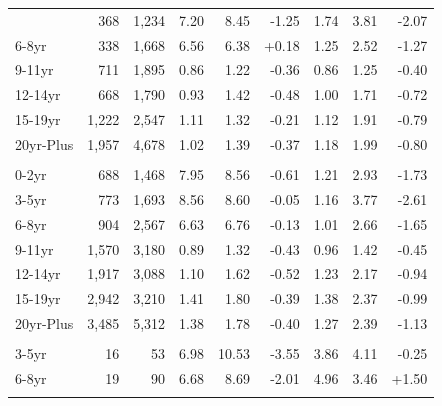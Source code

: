 \begin{table}
\begin{tabular}[t]{lrrrrrrrr}
{\hspace{1em}3-5yr & 368 & 1,234 & 7.20 & 8.45 & -1.25 & 1.74 & 3.81 & -2.07\\
\hspace{1em}6-8yr & 338 & 1,668 & 6.56 & 6.38 & +0.18 & 1.25 & 2.52 & -1.27\\
\hspace{1em}9-11yr & 711 & 1,895 & 0.86 & 1.22 & -0.36 & 0.86 & 1.25 & -0.40\\
\hspace{1em}12-14yr & 668 & 1,790 & 0.93 & 1.42 & -0.48 & 1.00 & 1.71 & -0.72\\
\hspace{1em}15-19yr & 1,222 & 2,547 & 1.11 & 1.32 & -0.21 & 1.12 & 1.91 & -0.79\\
\hspace{1em}20yr-Plus & 1,957 & 4,678 & 1.02 & 1.39 & -0.37 & 1.18 & 1.99 & -0.80\\
\addlinespace[0.3em]
\multicolumn{9}{l}{\textit{All-SW / Mixed-Or-Other}}\\
\hspace{1em}0-2yr & 688 & 1,468 & 7.95 & 8.56 & -0.61 & 1.21 & 2.93 & -1.73\\
\hspace{1em}3-5yr & 773 & 1,693 & 8.56 & 8.60 & -0.05 & 1.16 & 3.77 & -2.61\\
\hspace{1em}6-8yr & 904 & 2,567 & 6.63 & 6.76 & -0.13 & 1.01 & 2.66 & -1.65\\
\hspace{1em}9-11yr & 1,570 & 3,180 & 0.89 & 1.32 & -0.43 & 0.96 & 1.42 & -0.45\\
\hspace{1em}12-14yr & 1,917 & 3,088 & 1.10 & 1.62 & -0.52 & 1.23 & 2.17 & -0.94\\
\hspace{1em}15-19yr & 2,942 & 3,210 & 1.41 & 1.80 & -0.39 & 1.38 & 2.37 & -0.99\\
\hspace{1em}20yr-Plus & 3,485 & 5,312 & 1.38 & 1.78 & -0.40 & 1.27 & 2.39 & -1.13\\
\addlinespace[0.3em]
\multicolumn{9}{l}{\textit{Mixed-Wall / Mixed-Or-Other}}\\
\hspace{1em}3-5yr & 16 & 53 & 6.98 & 10.53 & -3.55 & 3.86 & 4.11 & -0.25\\
\hspace{1em}6-8yr & 19 & 90 & 6.68 & 8.69 & -2.01 & 4.96 & 3.46 & +1.50\\
}
\end{tabular}
\end{table}
